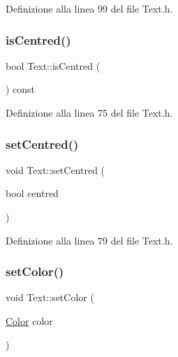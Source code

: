 Definizione alla linea 99 del file Text.\+h.

\mbox{\label{class_text_af5925ff2d034bb0f1db2e6e262a26a91}} 
\subsubsection{\texorpdfstring{is\+Centred()}{isCentred()}}
{\footnotesize\ttfamily bool Text\+::is\+Centred (\begin{DoxyParamCaption}{ }\end{DoxyParamCaption}) const\hspace{0.3cm}{\ttfamily [inline]}}



Definizione alla linea 75 del file Text.\+h.

\mbox{\label{class_text_a05e4942876754c566e8787e3000bc63b}} 
\subsubsection{\texorpdfstring{set\+Centred()}{setCentred()}}
{\footnotesize\ttfamily void Text\+::set\+Centred (\begin{DoxyParamCaption}\item[{bool}]{centred }\end{DoxyParamCaption})\hspace{0.3cm}{\ttfamily [inline]}}



Definizione alla linea 79 del file Text.\+h.

\mbox{\label{class_text_a60ed7c4137d0389255e009a4b2bc7223}} 
\subsubsection{\texorpdfstring{set\+Color()}{setColor()}}
{\footnotesize\ttfamily void Text\+::set\+Color (\begin{DoxyParamCaption}\item[{\hyperlink{struct_color}{Color}}]{color }\end{DoxyParamCaption})\hspace{0.3cm}{\ttfamily [inline]}}




